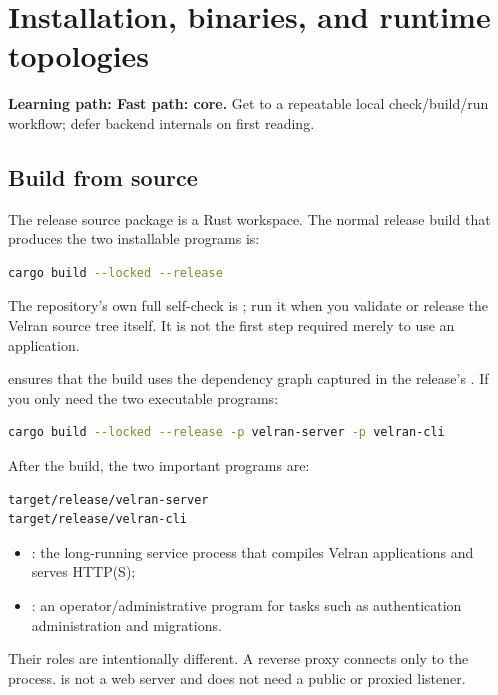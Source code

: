 \chapter{Installation, binaries, and runtime topologies}\label{ch:installation}

\noindent\textbf{Learning path: Fast path: core.} Get to a repeatable local check/build/run workflow; defer backend internals on first reading.\par\medskip

\section{Build from source}

The release source package is a Rust workspace. The normal release build that produces the two installable programs is:

\begin{lstlisting}[language=bash]
cargo build --locked --release
\end{lstlisting}

The repository's own full self-check is ; run it when you validate or release the Velran source tree itself. It is not the first step required merely to use an application.

 ensures that the build uses the dependency graph captured in the release's . If you only need the two executable programs:

\begin{lstlisting}[language=bash]
cargo build --locked --release -p velran-server -p velran-cli
\end{lstlisting}

After the build, the two important programs are:

\begin{lstlisting}
target/release/velran-server
target/release/velran-cli
\end{lstlisting}

\begin{itemize}
  \item {}: the long-running service process that compiles Velran applications and serves HTTP(S);
  \item {}: an operator/administrative program for tasks such as authentication administration and migrations.
\end{itemize}

Their roles are intentionally different. A reverse proxy connects only to the  process.  is not a web server and does not need a public or proxied listener.

